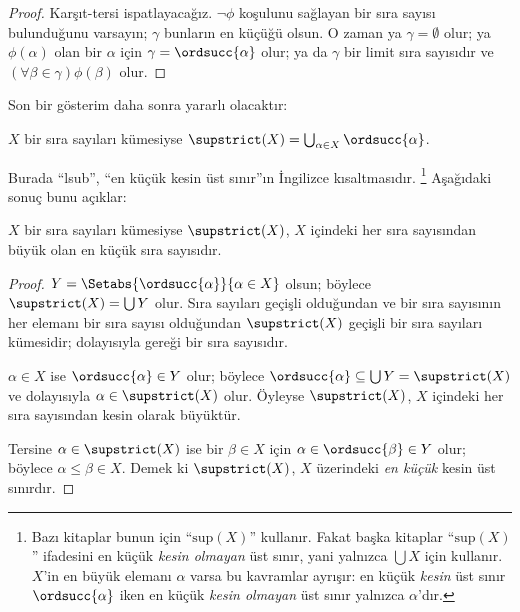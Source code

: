 \begin{proof}
Karşıt-tersi ispatlayacağız. $\lnot\phi$ koşulunu sağlayan bir sıra sayısı
bulunduğunu varsayın; $\gamma$ bunların en küçüğü olsun. O zaman ya
$\gamma=\emptyset$ olur; ya $\phi(\alpha)$ olan bir $\alpha$ için
$\gamma=\ordsucc{\alpha}$ olur; ya da $\gamma$ bir limit sıra sayısıdır ve
$(\forall\beta\in\gamma)\phi(\beta)$ olur.
\end{proof}
\noindent
Son bir gösterim daha sonra yararlı olacaktır:

\begin{defn}
$X$ bir sıra sayıları kümesiyse
$\supstrict(X)=\bigcup_{\alpha\in X}\ordsucc{\alpha}$.
\end{defn}
\noindent
Burada ``lsub'', ``en küçük kesin üst sınır''ın İngilizce kısaltmasıdır.
\footnote{Bazı kitaplar bunun için ``$\text{sup}(X)$'' kullanır. Fakat
başka kitaplar ``$\text{sup}(X)$'' ifadesini en küçük \emph{kesin olmayan}
üst sınır, yani yalnızca $\bigcup X$ için kullanır. $X$'in en büyük elemanı
$\alpha$ varsa bu kavramlar ayrışır: en küçük \emph{kesin} üst sınır
$\ordsucc{\alpha}$ iken en küçük \emph{kesin olmayan} üst sınır yalnızca
$\alpha$'dır.} Aşağıdaki sonuç bunu açıklar:

\begin{prop}
$X$ bir sıra sayıları kümesiyse $\supstrict(X)$, $X$ içindeki her sıra
sayısından büyük olan en küçük sıra sayısıdır.
\end{prop}

\begin{proof}
$Y=\Setabs{\ordsucc{\alpha}}{\alpha\in X}$ olsun; böylece
$\supstrict(X)=\bigcup Y$ olur. Sıra sayıları geçişli olduğundan ve bir sıra
sayısının her elemanı bir sıra sayısı olduğundan $\supstrict(X)$ geçişli bir
sıra sayıları kümesidir; dolayısıyla
 gereği bir sıra sayısıdır.

$\alpha\in X$ ise $\ordsucc{\alpha}\in Y$ olur; böylece
$\ordsucc{\alpha}\subseteq\bigcup Y=\supstrict(X)$ ve dolayısıyla
$\alpha\in\supstrict(X)$ olur. Öyleyse $\supstrict(X)$, $X$ içindeki her
sıra sayısından kesin olarak büyüktür.

Tersine $\alpha\in\supstrict(X)$ ise bir $\beta\in X$ için
$\alpha\in\ordsucc{\beta}\in Y$ olur; böylece $\alpha\leq\beta\in X$.
Demek ki $\supstrict(X)$, $X$ üzerindeki \emph{en küçük} kesin üst sınırdır.
\end{proof}

